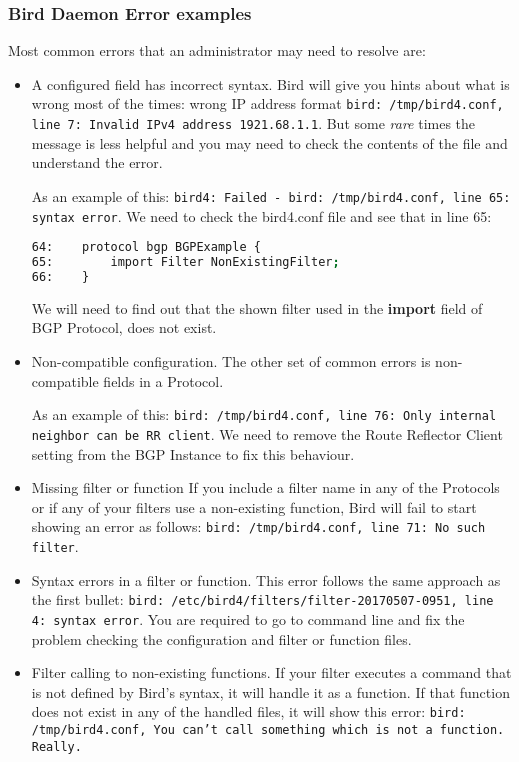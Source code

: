 \subsubsection{Bird Daemon Error examples}
Most common errors that an administrator may need to resolve are:

\begin{itemize}
\item A configured field has incorrect syntax.
Bird will give you hints about what is wrong most of the times: wrong IP address format \texttt{bird: /tmp/bird4.conf, line 7: Invalid IPv4 address 1921.68.1.1}. But some \textit{rare} times the message is less helpful and you may need to check the contents of the file and understand the error.

As an example of this: \texttt{bird4: Failed - bird: /tmp/bird4.conf, line 65: syntax error}. We need to check the bird4.conf file and see that in line 65:

\begin{lstlisting}[language=bash, caption={Bird4.conf contents}]
64:    protocol bgp BGPExample {
65:        import Filter NonExistingFilter;
66:    }
\end{lstlisting}

We will need to find out that the shown filter used in the \textbf{import} field of BGP Protocol, does not exist.

\item Non-compatible configuration.
The other set of common errors is non-compatible fields in a Protocol.

As an example of this: \texttt{bird: /tmp/bird4.conf, line 76: Only internal neighbor can be RR client}. We need to remove the Route Reflector Client setting from the BGP Instance to fix this behaviour.

\item Missing filter or function
If you include a filter name in any of the Protocols or if any of your filters use a non-existing function, Bird will fail to start showing an error as follows: \texttt{bird: /tmp/bird4.conf, line 71: No such filter}.

\item Syntax errors in a filter or function.
This error follows the same approach as the first bullet: \texttt{bird: /etc/bird4/filters/filter-20170507-0951, line 4: syntax error}. You are required to go to command line and fix the problem checking the configuration and filter or function files.

\item Filter calling to non-existing functions.
If your filter executes a command that is not defined by Bird's syntax, it will handle it as a function. If that function does not exist in any of the handled files, it will show this error: \texttt{bird: /tmp/bird4.conf, You can't call something which is not a function. Really.}


\end{itemize}
